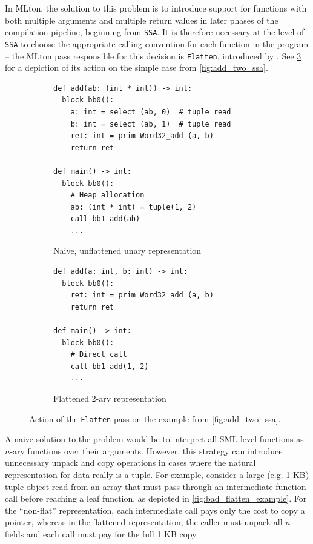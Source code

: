 In MLton, the solution to this problem is to introduce support for functions
with both multiple arguments and multiple return values in later phases of the
compilation pipeline, beginning from \texttt{SSA}. It is therefore necessary at
the level of \texttt{SSA} to choose the appropriate calling convention for each
function in the program -- the MLton pass responsible for this decision is
\texttt{Flatten}, introduced by \citet{flat-paper}. See
\cref{fig:flatten_one_add} for a depiction of its action on the simple case from
\cref{fig:add_two_ssa}.


\begin{figure}[htbp]
  \centering
  \begin{subfigure}[t]{0.48\textwidth}
    \caption{Naive, unflattened unary representation}
    \label{fig:flatten_one_add_unary}
    \vspace{1mm}
\begin{verbatim}
def add(ab: (int * int)) -> int:
  block bb0():
    a: int = select (ab, 0)  # tuple read
    b: int = select (ab, 1)  # tuple read
    ret: int = prim Word32_add (a, b)
    return ret

def main() -> int:
  block bb0():
    # Heap allocation
    ab: (int * int) = tuple(1, 2)
    call bb1 add(ab)
    ...
\end{verbatim}
  \end{subfigure}\hfill
  \begin{subfigure}[t]{0.48\textwidth}
    \caption{Flattened 2-ary representation}
    \label{fig:flatten_one_add_flat}
    \vspace{1mm}
\begin{verbatim}
def add(a: int, b: int) -> int:
  block bb0():
    ret: int = prim Word32_add (a, b)
    return ret

def main() -> int:
  block bb0():
    # Direct call
    call bb1 add(1, 2)
    ...
\end{verbatim}
  \end{subfigure}
  \caption{Action of the \texttt{Flatten} pass on the example from \cref{fig:add_two_ssa}.}
  \label{fig:flatten_one_add}
\end{figure}


A naive solution to the problem would be to interpret all SML-level functions as
$n$-ary functions over their arguments. However, this strategy can introduce
unnecessary unpack and copy operations in cases where the natural representation
for data really is a tuple. For example, consider a large (e.g. 1 KB) tuple
object read from an array that must pass through an intermediate function call
before reaching a leaf function, as depicted in \cref{fig:bad_flatten_example}.
For the ``non-flat'' representation, each intermediate call pays only the cost
to copy a pointer, whereas in the flattened representation, the caller must
unpack all $n$ fields and each call must pay for the full 1 KB copy.

